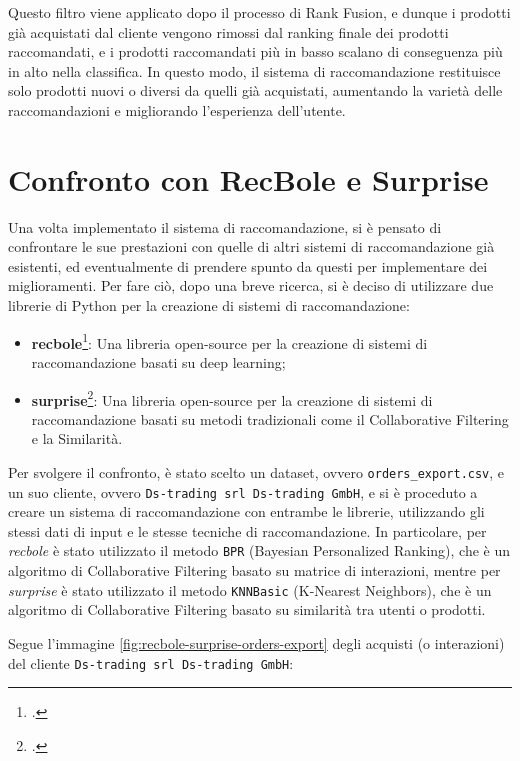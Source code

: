 Questo filtro viene applicato dopo il processo di Rank Fusion, e dunque i prodotti già acquistati dal cliente vengono rimossi dal ranking finale dei prodotti raccomandati, e i prodotti raccomandati più in basso scalano di conseguenza più in alto nella classifica. In questo modo, il sistema di raccomandazione restituisce solo prodotti nuovi o diversi da quelli già acquistati, aumentando la varietà delle raccomandazioni e migliorando l'esperienza dell'utente.


\section{Confronto con RecBole e Surprise}

Una volta implementato il sistema di raccomandazione, si è pensato di confrontare le sue prestazioni con quelle di altri sistemi di raccomandazione già esistenti, ed eventualmente di prendere spunto da questi per implementare dei miglioramenti.
Per fare ciò, dopo una breve ricerca, si è deciso di utilizzare due librerie di Python per la creazione di sistemi di raccomandazione:
\begin{itemize}
    \item \textbf{\gls{recbole}}\footcite{site:recbole}: Una libreria open-source per la creazione di sistemi di raccomandazione basati su deep learning;
    \item \textbf{\gls{surprise}}\footcite{site:surprise}: Una libreria open-source per la creazione di sistemi di raccomandazione basati su metodi tradizionali come il Collaborative Filtering e la Similarità.
\end{itemize}

Per svolgere il confronto, è stato scelto un dataset, ovvero \texttt{orders\_export.csv}, e un suo cliente, ovvero \texttt{Ds-trading srl Ds-trading GmbH}, e si è proceduto a creare un sistema di raccomandazione con entrambe le librerie, utilizzando gli stessi dati di input e le stesse tecniche di raccomandazione. In particolare, per \emph{recbole} è stato utilizzato il metodo \texttt{BPR} (Bayesian Personalized Ranking), che è un algoritmo di Collaborative Filtering basato su matrice di interazioni, mentre per \emph{surprise} è stato utilizzato il metodo \texttt{KNNBasic} (K-Nearest Neighbors), che è un algoritmo di Collaborative Filtering basato su similarità tra utenti o prodotti.

Segue l'immagine \ref{fig:recbole-surprise-orders-export} degli acquisti (o interazioni) del cliente \texttt{Ds-trading srl Ds-trading GmbH}:

